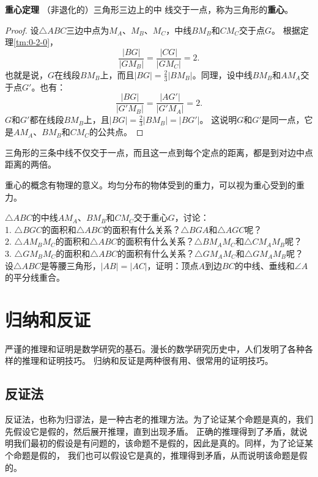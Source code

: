 \documentclass[12pt,UTF8]{ctexbook}
\begin{document}
\begin{tm}{\textbf{重心定理}}\label{tm:1-3-0}
    （非退化的）三角形三边上的中
    线交于一点，称为三角形的\textbf{重心}。
\end{tm}
\begin{proof}
    设$\triangle ABC$三边中点为$M_A$、$M_B$、$M_C$，中线$BM_B$和$CM_C$交于点$G$。
    根据定理\ref{tm:0-2-0}，
    $$\frac{|BG|}{|GM_B|} = \frac{|CG|}{|GM_C|} = 2.$$
    也就是说，$G$在线段$BM_B$上，而且$|BG| = \frac23 |BM_B|$。同理，设中线$BM_B$和$AM_A$交于点$G'$。也有：
    $$\frac{|BG|}{|G'M_B|} = \frac{|AG'|}{|G'M_A|} = 2.$$
    $G$和$G'$都在线段$BM_B$上，且$|BG| = \frac23 |BM_B| = |BG'|$。
    这说明$G$和$G'$是同一点，它是$AM_A$、$BM_B$和$CM_C$的公共点。
\end{proof}
三角形的三条中线不仅交于一点，而且这一点到每个定点的距离，都是到对边中点距离的两倍。

重心的概念有物理的意义。均匀分布的物体受到的重力，可以视为重心受到的重力。
\begin{xt}\label{xt:1-3-0}
    $\triangle ABC$的中线$AM_A$、$BM_B$和$CM_C$交于重心$G$，讨论：\\
    1. $\triangle BGC$的面积和$\triangle ABC$的面积有什么关系？$\triangle BGA$和$\triangle AGC$呢？\\
    2. $\triangle AM_BM_C$的面积和$\triangle ABC$的面积有什么关系？$\triangle BM_AM_C$和$\triangle CM_AM_B$呢？\\
    3. $\triangle GM_BM_C$的面积和$\triangle ABC$的面积有什么关系？$\triangle GM_AM_C$和$\triangle GM_AM_B$呢？\\
    设$\triangle ABC$是等腰三角形，$|AB| = |AC|$，证明：顶点$A$到边$BC$的中线、垂线和$\angle A$的平分线重合。\\
\end{xt}

\chapter{归纳和反证}
严谨的推理和证明是数学研究的基石。漫长的数学研究历史中，人们发明了各种各样的推理和证明技巧。
归纳和反证是两种很有用、很常用的证明技巧。

\section{反证法}
反证法，也称为归谬法，是一种古老的推理方法。为了论证某个命题是真的，我们先假设它是假的，然后展开推理，直到出现矛盾。
正确的推理得到了矛盾，就说明我们最初的假设是有问题的，该命题不是假的，因此是真的。同样，为了论证某个命题是假的，
我们也可以假设它是真的，推理得到矛盾，从而说明该命题是假的。
\end{document}
